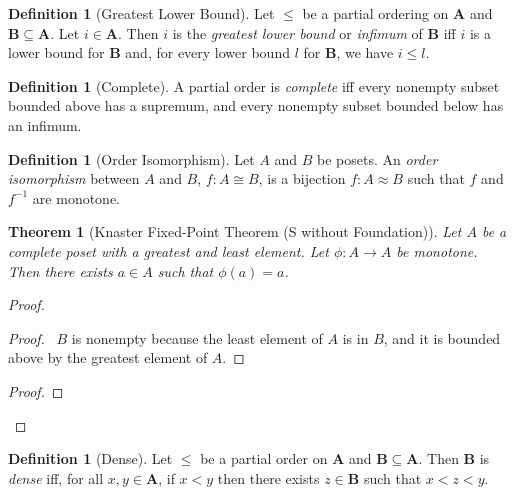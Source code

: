 \documentclass{book}
\let\qed\relax
\newtheorem{thm}[ax]{Theorem}
\theoremstyle{definition}
\newtheorem{df}[ax]{Definition}
\begin{document}
\begin{df}[Greatest Lower Bound]
Let $\leq$ be a partial ordering on $\mathbf{A}$ and $\mathbf{B} \subseteq \mathbf{A}$. Let $i \in \mathbf{A}$. Then $i$ is the \emph{greatest lower bound} or \emph{infimum} of $\mathbf{B}$ iff $i$ is a lower bound for $\mathbf{B}$ and, for every lower bound $l$ for $\mathbf{B}$, we have $i \leq l$.
\end{df}

\begin{df}[Complete]
A partial order is \emph{complete} iff every nonempty subset bounded above has a supremum, and every nonempty subset bounded below has an infimum.
\end{df}

\begin{df}[Order Isomorphism]
Let $A$ and $B$ be posets. An \emph{order isomorphism} between $A$ and $B$, $f : A \cong B$, is a bijection $f : A \approx B$ such that $f$ and $f^{-1}$ are monotone.
\end{df}
	
\begin{thm}[Knaster Fixed-Point Theorem (S without Foundation)]
Let $A$ be a complete poset with a greatest and least element. Let $\phi : A \rightarrow A$ be monotone. Then there exists $a \in A$ such that $\phi(a) = a$.
\end{thm}

\begin{proof}
\pf
{}
\begin{proof}
	\pf\ $B$ is nonempty because the least element of $A$ is in $B$, and it is bounded above by the greatest element of $A$.
\end{proof}
\begin{proof}
\end{proof}
\qed
\end{proof}

\begin{df}[Dense]
Let $\leq$ be a partial order on $\mathbf{A}$ and
$\mathbf{B} \subseteq \mathbf{A}$. Then $\mathbf{B}$ is \emph{dense} iff, for all $x,y \in \mathbf{A}$, if $x < y$ then there exists $z \in \mathbf{B}$ such that $x < z < y$.
\end{df}
\end{document}
